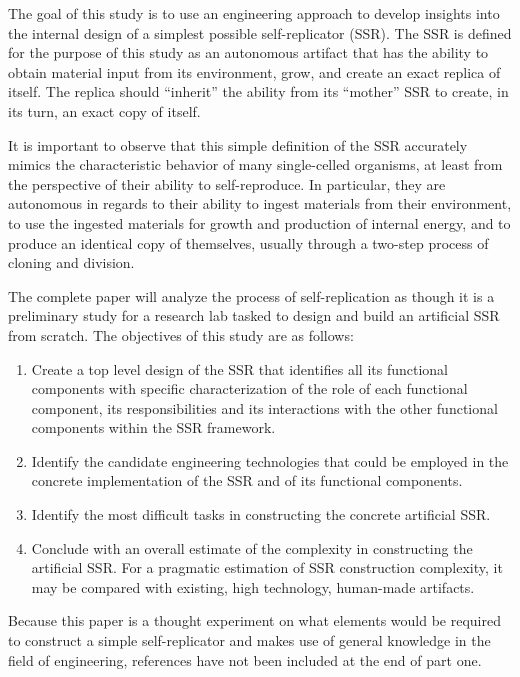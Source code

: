 The goal of this study is to use an engineering approach to develop
insights into the internal design of a simplest possible self-replicator (SSR). 
The SSR is defined for the purpose of this study as
an autonomous artifact that has the ability to obtain material input from
its environment, grow, and create an exact replica of itself. The
replica should ``inherit'' the ability from its ``mother'' SSR to create,
in its turn, an exact copy of itself.

It is important to observe that this simple definition of the SSR accurately mimics the characteristic behavior of many single-celled organisms, at least from the perspective of their ability to self-reproduce. In particular, they are autonomous in regards to their ability to ingest materials from their environment, to use the ingested materials for growth and production of internal energy, and to produce an identical copy of themselves, usually through a two-step process of cloning and division. 

The complete paper will analyze the process of self-replication as though it is a preliminary study for a research lab tasked to design and build an artificial SSR from scratch. The objectives of this study are as follows:

\begin{enumerate}
\item  Create a top level design of the SSR that identifies all its
functional components with specific characterization of the role of
each functional component, its responsibilities and its interactions
with the other functional components within the SSR framework.
\item  Identify the candidate engineering technologies that could be employed in
the concrete implementation of the SSR and of its functional
components.
\item  Identify the most difficult tasks in constructing the
concrete artificial SSR.
\item  Conclude with an overall estimate of the complexity 
in constructing
the artificial SSR. For a pragmatic estimation of
SSR construction complexity, it may be compared with 
existing, high technology, human-made artifacts.
\end{enumerate}

Because this paper is a thought experiment on what elements would be required to construct a simple self-replicator and makes use of general knowledge in the field of engineering, references have not been included at the end of part one.

